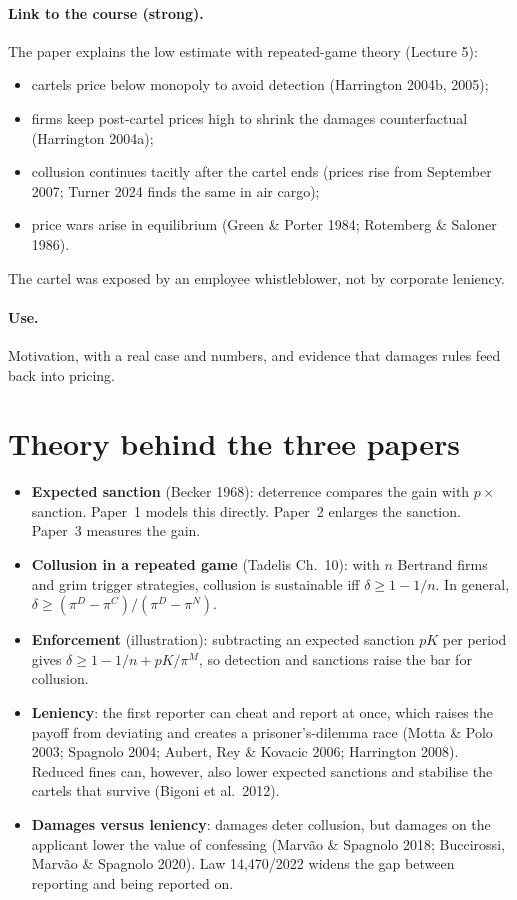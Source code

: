 \documentclass[11pt,a4paper]{article}
\begin{document}
\paragraph{Link to the course (strong).} The paper explains the low estimate with repeated-game
theory (Lecture 5):
\begin{itemize}
\item cartels price below monopoly to avoid detection (Harrington 2004b, 2005);
\item firms keep post-cartel prices high to shrink the damages counterfactual (Harrington 2004a);
\item collusion continues tacitly after the cartel ends (prices rise from September 2007; Turner
2024 finds the same in air cargo);
\item price wars arise in equilibrium (Green \& Porter 1984; Rotemberg \& Saloner 1986).
\end{itemize}
The cartel was exposed by an employee whistleblower, not by corporate leniency.

\paragraph{Use.} Motivation, with a real case and numbers, and evidence that damages rules feed
back into pricing.

\section{Theory behind the three papers}
\begin{itemize}
\item \textbf{Expected sanction} (Becker 1968): deterrence compares the gain with $p\times$sanction.
Paper~1 models this directly. Paper~2 enlarges the sanction. Paper~3 measures the gain.
\item \textbf{Collusion in a repeated game} (Tadelis Ch.~10): with $n$ Bertrand firms and grim
trigger strategies, collusion is sustainable iff $\delta\ge 1-1/n$. In general,
$\delta \ge (\pi^{D}-\pi^{C})/(\pi^{D}-\pi^{N})$.
\item \textbf{Enforcement} (illustration): subtracting an expected sanction $pK$ per period gives
$\delta \ge 1-1/n + pK/\pi^{M}$, so detection and sanctions raise the bar for collusion.
\item \textbf{Leniency}: the first reporter can cheat and report at once, which raises the payoff
from deviating and creates a prisoner's-dilemma race (Motta \& Polo 2003; Spagnolo 2004; Aubert,
Rey \& Kovacic 2006; Harrington 2008). Reduced fines can, however, also lower expected sanctions
and stabilise the cartels that survive (Bigoni et al.\ 2012).
\item \textbf{Damages versus leniency}: damages deter collusion, but damages on the applicant lower
the value of confessing (Marvão \& Spagnolo 2018; Buccirossi, Marvão \& Spagnolo 2020). Law
14,470/2022 widens the gap between reporting and being reported on.
\end{itemize}
\end{document}
